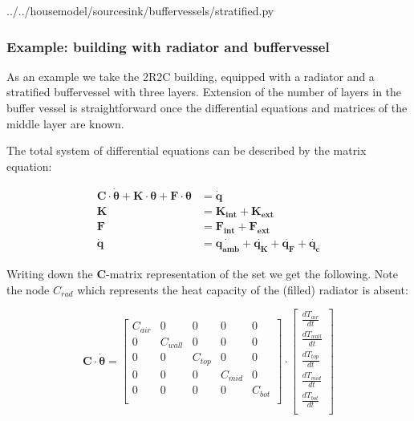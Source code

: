  
{../../housemodel/sourcesink/buffervessels/stratified.py}

\newpage


\subsubsection{Example: building with radiator and buffervessel}

As an example we take the 2R2C building, equipped with a radiator and a stratified buffervessel with three layers. Extension of the number of layers in the buffer vessel is straightforward once the differential equations and matrices of the middle layer are known.

The total system of differential equations can be described by the matrix equation:

\begin{subequations}
	\label{app:eq:matexample}
	\begin{align}
		\mathbf{C} \cdot \boldsymbol{\dot{\theta}} + \mathbf{K} \cdot \boldsymbol{\theta} + \mathbf{F} \cdot \boldsymbol{\theta} &= \mathbf{\dot{q}} \\
		\mathbf{K} &= \mathbf{K_{int}} + \mathbf{K_{ext}} \\
		\mathbf{F} &= \mathbf{F_{int}} + \mathbf{F_{ext}} \\
		\mathbf{\dot{q}} &= \mathbf{\dot{q_{amb}}} + \mathbf{\dot{q_{K}}} + \mathbf{\dot{q_{F}}} + \mathbf{\dot{q_{c}}}
	\end{align}
\end{subequations}

Writing down the $\mathbf{C}$-matrix representation of the set we get the following. Note the node $C_{rad}$ which represents the heat capacity of the (filled) radiator is absent:

\begin{equation}
	\mathbf{C} \cdot \boldsymbol{\dot{\theta}} =
	\begin{bmatrix}
		C_{air} & 0 & 0 & 0 & 0  \\
		0 & C_{wall} & 0 & 0 & 0 \\
		0 & 0 & C_{top} & 0 & 0  \\
		0 & 0 & 0 & C_{mid} & 0  \\
		0 & 0 & 0 & 0 & C_{bot}  \\
	\end{bmatrix}
	\cdot
	\begin{bmatrix}
		\frac{dT_{air}}{dt}  \\
		\frac{dT_{wall}}{dt} \\
		\frac{dT_{top}}{dt}  \\
		\frac{dT_{mid}}{dt}  \\
		\frac{dT_{bot}}{dt}  \\
	\end{bmatrix}
\end{equation}

